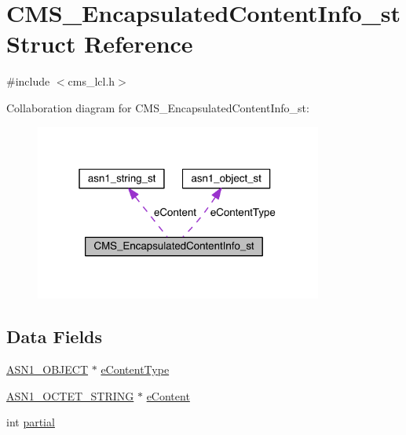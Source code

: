 \hypertarget{struct_c_m_s___encapsulated_content_info__st}{}\section{C\+M\+S\+\_\+\+Encapsulated\+Content\+Info\+\_\+st Struct Reference}
\label{struct_c_m_s___encapsulated_content_info__st}


{\ttfamily \#include $<$cms\+\_\+lcl.\+h$>$}



Collaboration diagram for C\+M\+S\+\_\+\+Encapsulated\+Content\+Info\+\_\+st\+:\nopagebreak
\begin{figure}[H]
\begin{center}
\leavevmode
\includegraphics[width=268pt]{struct_c_m_s___encapsulated_content_info__st__coll__graph}
\end{center}
\end{figure}
\subsection*{Data Fields}
\begin{DoxyCompactItemize}
\item 
\hyperlink{crypto_2ossl__typ_8h_ae3fda0801e4c8e250087052bafb3ce2e}{A\+S\+N1\+\_\+\+O\+B\+J\+E\+CT} $\ast$ \hyperlink{struct_c_m_s___encapsulated_content_info__st_ae94ccf6359f5e6d795acf968c32e3913}{e\+Content\+Type}
\item 
\hyperlink{crypto_2ossl__typ_8h_afbd05e94e0f0430a2b729473efec88c1}{A\+S\+N1\+\_\+\+O\+C\+T\+E\+T\+\_\+\+S\+T\+R\+I\+NG} $\ast$ \hyperlink{struct_c_m_s___encapsulated_content_info__st_abd7e930f01087edaa2a76e78978f2717}{e\+Content}
\item 
int \hyperlink{struct_c_m_s___encapsulated_content_info__st_aa1f78d5d6584bbebecab02ba69f9b4ec}{partial}
\end{DoxyCompactItemize}


